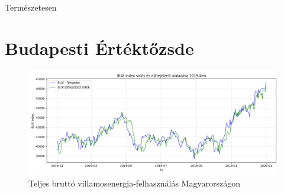 Természetesen

\section{Budapesti Értéktőzsde}

\begin{figure}[htbp]
    \centering
    \includegraphics[width=1\textwidth, height=0.8\textheight, keepaspectratio]{../figures/bux_daily_forecast.png}
    \caption{Teljes bruttó villamosenergia-felhasználás Magyarországon}\label{fig:bux_daily_forecast}
\end{figure}
